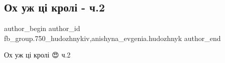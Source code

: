  
 
 
 
 

\subsection{Ох уж ці кролі - ч.2}
\label{sec:07_04_2018.fb.fb_group.750_hudozhnykiv.1.oh_uzh_ci_kroli_ch_2}
 
\ifcmt
 author_begin
   author_id fb_group.750_hudozhnykiv,anishyna_evgenia.hudozhnyk
 author_end
\fi

Ох уж ці кролі 😍 ч.2
